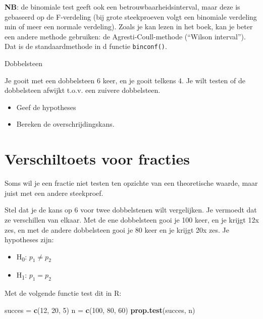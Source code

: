 \documentclass[]{book}
\newenvironment{Shaded}{\begin{snugshade}}{\end{snugshade}}
\newcommand{\KeywordTok}[1]{\textcolor[rgb]{0.13,0.29,0.53}{\textbf{{#1}}}}
\newcommand{\DecValTok}[1]{\textcolor[rgb]{0.00,0.00,0.81}{{#1}}}
\newcommand{\StringTok}[1]{\textcolor[rgb]{0.31,0.60,0.02}{{#1}}}
\newcommand{\NormalTok}[1]{{#1}}
\providecommand{\tightlist}{%
  \setlength{\itemsep}{0pt}\setlength{\parskip}{0pt}}
\theoremstyle{definition}
\theoremstyle{definition}
\theoremstyle{definition}
\theoremstyle{remark}
\let\BeginKnitrBlock\begin \let\EndKnitrBlock\end
\begin{document}
\textbf{NB}: de binomiale test geeft ook een betrouwbaarheidsinterval,
maar deze is gebaseerd op de F-verdeling (bij grote steekproeven volgt
een binomiale verdeling min of meer een normale verdeling). Zoals je kan
lezen in het boek, kan je beter een andere methode gebruiken: de
Agresti-Coull-methode (``Wilson interval''). Dat is de standaardmethode
in d functie \texttt{binconf()}.

\BeginKnitrBlock{exercise}
\protect\hypertarget{exr:dobbelsteen2}{}{\label{exr:dobbelsteen2}
}Dobbelsteen

Je gooit met een dobbelsteen 6 keer, en je gooit telkens 4. Je wilt
testen of de dobbelsteen afwijkt t.o.v. een zuivere dobbelsteen.

\begin{itemize}
\tightlist
\item
  Geef de hypotheses
\item
  Bereken de overschrijdingskans.
\end{itemize}
\EndKnitrBlock{exercise}

\section{Verschiltoets voor fracties}\label{verschiltoets-voor-fracties}

Soms wil je een fractie niet testen ten opzichte van een theoretische
waarde, maar juist met een andere steekproef.

Stel dat je de kans op 6 voor twee dobbelstenen wilt vergelijken. Je
vermoedt dat ze verschillen van elkaar. Met de ene dobbelsteen gooi je
100 keer, en je krijgt 12x zes, en met de andere dobbelsteen gooi je 80
keer en je krijgt 20x zes. Je hypotheses zijn:

\begin{itemize}
\tightlist
\item
  H\textsubscript{0}: \(p_{1} \neq p_{2}\)
\item
  H\textsubscript{1}: \(p_{1} = p_{2}\)
\end{itemize}

Met de volgende functie test dit in R:

\begin{Shaded}
\begin{Highlighting}[]
\NormalTok{succes =}\StringTok{ }\KeywordTok{c}\NormalTok{(}\DecValTok{12}\NormalTok{, }\DecValTok{20}\NormalTok{, }\DecValTok{5}\NormalTok{)}
\NormalTok{n =}\StringTok{ }\KeywordTok{c}\NormalTok{(}\DecValTok{100}\NormalTok{, }\DecValTok{80}\NormalTok{, }\DecValTok{60}\NormalTok{)}
\KeywordTok{prop.test}\NormalTok{(succes, n)}
\end{Highlighting}
\end{Shaded}
\end{document}
